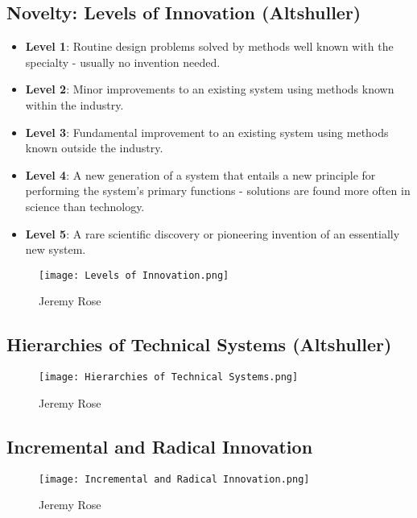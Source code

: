 \subsection{Novelty: Levels of Innovation (Altshuller)}
\begin{itemize}
	\item \textbf{Level 1}: Routine design problems solved by methods well known with the specialty - usually no invention needed.
	\item \textbf{Level 2}: Minor improvements to an existing system using methods known within the industry.
	\item \textbf{Level 3}: Fundamental improvement to an existing system using methods known outside the industry.
	\item \textbf{Level 4}: A new generation of a system that entails a new principle for performing the system's primary functions - solutions are found more often in science than technology.
	\item \textbf{Level 5}: A rare scientific discovery or pioneering invention of an essentially new system.
\end{itemize}

\begin{figure}[H]
	\centering
	\texttt{[image: Levels of Innovation.png]}
	\caption{Jeremy Rose}
\end{figure}

\subsection{Hierarchies of Technical Systems (Altshuller)}
\begin{figure}[H]
	\centering
	\texttt{[image: Hierarchies of Technical Systems.png]}
	\caption{Jeremy Rose}
\end{figure}

\subsection{Incremental and Radical Innovation}
\begin{figure}[H]
	\centering
	\texttt{[image: Incremental and Radical Innovation.png]}
	\caption{Jeremy Rose}
\end{figure}